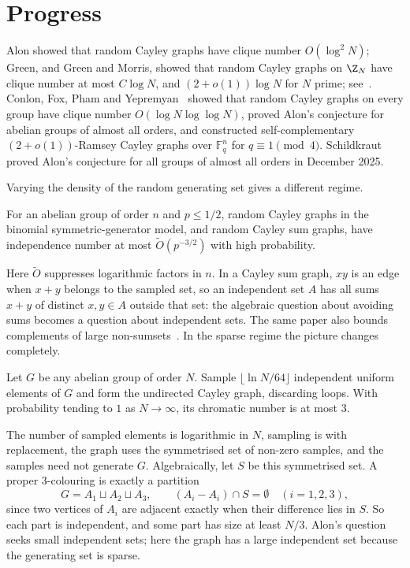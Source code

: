 \section{Progress}\label{sec:progress}


Alon showed that random Cayley graphs have clique number $O(\log^2N)$; Green, and Green and Morris, showed that random Cayley graphs on $\Z_N$ have clique number at most $C\log N$, and $(2+o(1))\log N$ for $N$ prime; see~\cite{cfpy24}. Conlon, Fox, Pham and Yepremyan~\cite{cfpy24} showed that random Cayley graphs on every group have clique number $O(\log N\log\log N)$, proved Alon's conjecture for abelian groups of almost all orders, and constructed self-complementary $(2+o(1))$-Ramsey Cayley graphs over $\mathbb F_q^n$ for $q\equiv1\pmod4$. Schildkraut~\cite{sch25} proved Alon's conjecture for all groups of almost all orders in December 2025.

Varying the density of the random generating set gives a different regime.

\begin{theorem}\label{thm:alon-pham}
For an abelian group of order $n$ and $p\leq1/2$, random Cayley graphs in the binomial symmetric-generator model, and random Cayley sum graphs, have independence number at most $\widetilde O(p^{-3/2})$ with high probability.
\end{theorem}

Here $\widetilde O$ suppresses logarithmic factors in $n$. In a Cayley sum graph, $xy$ is an edge when $x+y$ belongs to the sampled set, so an independent set $A$ has all sums $x+y$ of distinct $x,y\in A$ outside that set: the algebraic question about avoiding sums becomes a question about independent sets. The same paper also bounds complements of large non-sumsets~\cite[Theorem~5]{ap25}. In the sparse regime the picture changes completely.

\begin{theorem}\label{thm:tung}
Let $G$ be any abelian group of order $N$. Sample $\lfloor\ln N/64\rfloor$ independent uniform elements of $G$ and form the undirected Cayley graph, discarding loops. With probability tending to $1$ as $N\to\infty$, its chromatic number is at most $3$.
\end{theorem}

The number of sampled elements is logarithmic in $N$, sampling is with replacement, the graph uses the symmetrised set of non-zero samples, and the samples need not generate $G$. Algebraically, let $S$ be this symmetrised set. A proper $3$-colouring is exactly a partition
\[
G=A_1\sqcup A_2\sqcup A_3,\qquad (A_i-A_i)\cap S=\emptyset\quad(i=1,2,3),
\]
since two vertices of $A_i$ are adjacent exactly when their difference lies in $S$. So each part is independent, and some part has size at least $N/3$. Alon's question seeks small independent sets; here the graph has a large independent set because the generating set is sparse.

